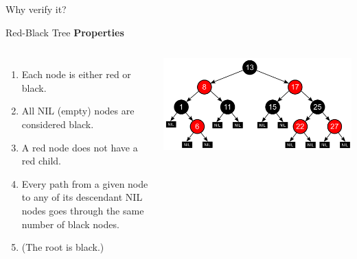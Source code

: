 \begin{frame}[standout]
  Why verify it?
\end{frame}

\begin{frame}{Red-Black Tree}
\textbf{Properties} \cite{rbtree}
\begin{columns}[T]
\begin{enumerate}
  \item Each node is either red or black.
  \item All NIL (empty) nodes are considered black.
  \item A red node does not have a red child.
  \item Every path from a given node to any of its descendant NIL nodes goes through the same number of black nodes.
  \item (The root is black.)
\end{enumerate}

\centering
\includegraphics[width=\textwidth]{img/rbtree.png}
\end{columns}
\end{frame}

